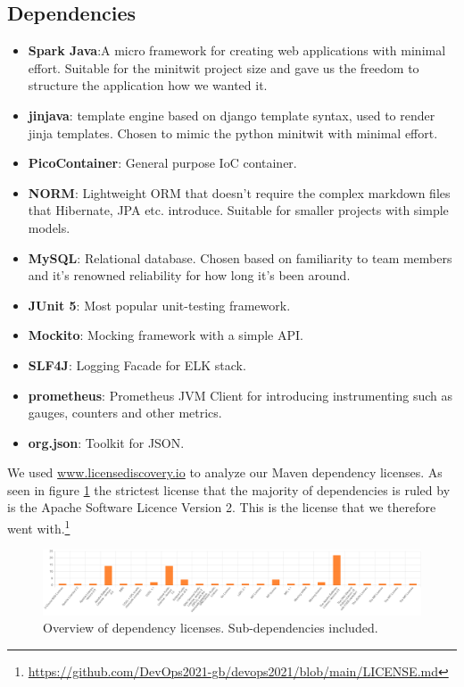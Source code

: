 \subsection{Dependencies } %
\begin{itemize}
    \item \textbf{Spark Java}:A micro framework for creating web applications with minimal effort. Suitable for the minitwit project size and gave us the freedom to structure the application how we wanted it.
    \item \textbf{jinjava}: template engine based on django template syntax, used to render jinja templates. Chosen to mimic the python minitwit with minimal effort. 
    \item \textbf{PicoContainer}: General purpose IoC container.
    \item \textbf{NORM}: Lightweight ORM that doesn't require the complex markdown files that Hibernate, JPA etc. introduce. Suitable for smaller projects with simple models. 
    \item \textbf{MySQL}: Relational database. Chosen based on familiarity to team members and it's renowned reliability for how long it's been around.  
    \item \textbf{JUnit 5}: Most popular unit-testing framework.
    \item \textbf{Mockito}: Mocking framework with a simple API.
    \item \textbf{SLF4J}: Logging Facade for ELK stack. 
    \item \textbf{prometheus}: Prometheus JVM Client for introducing instrumenting such as gauges, counters and other metrics.
    \item \textbf{org.json}: Toolkit for JSON.
\end{itemize}


We used \url{www.licensediscovery.io} to analyze our Maven dependency licenses. As seen in figure \ref{fig:licenceDep} the strictest license that the majority of dependencies is ruled by is the Apache Software Licence Version 2. This is the license that we therefore went with.\footnote{\url{https://github.com/DevOps2021-gb/devops2021/blob/main/LICENSE.md}} 
\begin{figure}[!htb]
    \centering
    \includegraphics[scale=0.2]{images/LicenceDependencies.png}
    \caption{Overview of dependency licenses. Sub-dependencies included.}
    \label{fig:licenceDep}
\end{figure}



